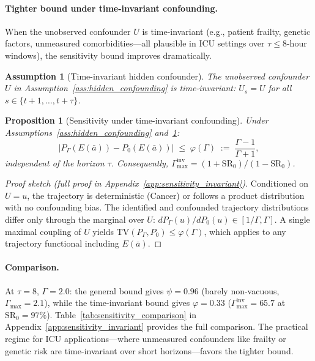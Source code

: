 \documentclass{article}
\newtheorem{proposition}[theorem]{Proposition}
\newtheorem{assumption}{Assumption}
\newcommand{\TV}{\mathrm{TV}}
\newcommand{\ba}{\bar{a}}
\begin{document}
\vspace{-0.5em}
\paragraph{Tighter bound under time-invariant confounding.}
When the unobserved confounder $U$ is time-invariant (e.g., patient frailty, genetic factors, unmeasured comorbidities---all plausible in ICU settings over $\tau \leq 8$-hour windows), the sensitivity bound improves dramatically.

\begin{assumption}[Time-invariant hidden confounder]
\label{ass:time_invariant}
The unobserved confounder $U$ in Assumption~\ref{ass:hidden_confounding} is time-invariant: $U_s = U$ for all $s \in \{t{+}1, \ldots, t{+}\tau\}$.
\end{assumption}

\begin{proposition}[Sensitivity under time-invariant confounding]
\label{prop:sensitivity_invariant}
Under Assumptions~\ref{ass:hidden_confounding} and~\ref{ass:time_invariant}:
\begin{equation}
\label{eq:sensitivity_invariant}
|P_\Gamma(E(\ba)) - P_0(E(\ba))| \;\leq\; \varphi(\Gamma) \;:=\; \frac{\Gamma - 1}{\Gamma + 1},
\end{equation}
independent of the horizon $\tau$. Consequently, $\Gamma_{\max}^{\mathrm{inv}} = (1 + \mathrm{SR}_0)/(1 - \mathrm{SR}_0)$.
\end{proposition}

\begin{proof}[Proof sketch (full proof in Appendix~\ref{app:sensitivity_invariant})]
Conditioned on $U = u$, the trajectory is deterministic (Cancer) or follows a product distribution with no confounding bias. The identified and confounded trajectory distributions differ only through the marginal over $U$: $dP_\Gamma(u)/dP_0(u) \in [1/\Gamma, \Gamma]$. A single maximal coupling of $U$ yields $\TV(P_\Gamma, P_0) \leq \varphi(\Gamma)$, which applies to any trajectory functional including $E(\ba)$.
\end{proof}

\vspace{-0.8em}
\paragraph{Comparison.} At $\tau = 8$, $\Gamma = 2.0$: the general bound gives $\psi = 0.96$ (barely non-vacuous, $\Gamma_{\max} = 2.1$), while the time-invariant bound gives $\varphi = 0.33$ ($\Gamma_{\max}^{\mathrm{inv}} = 65.7$ at $\mathrm{SR}_0 = 97\%$). Table~\ref{tab:sensitivity_comparison} in Appendix~\ref{app:sensitivity_invariant} provides the full comparison. The practical regime for ICU applications---where unmeasured confounders like frailty or genetic risk are time-invariant over short horizons---favors the tighter bound.
\end{document}
